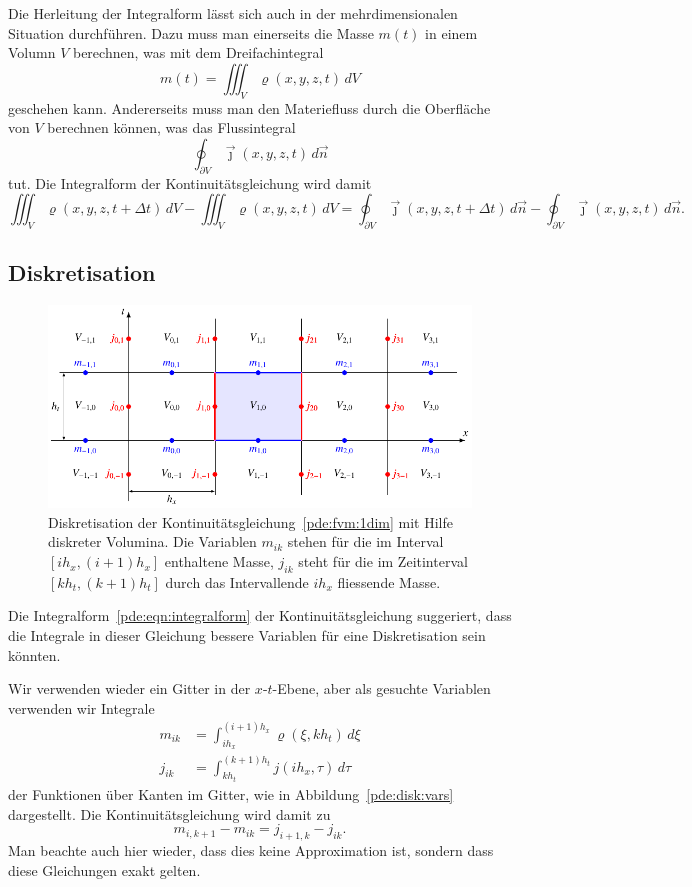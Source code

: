 Die Herleitung der Integralform lässt sich auch in der mehrdimensionalen
Situation durchführen.
Dazu muss man einerseits die Masse $m(t)$ in einem Volumn $V$ berechnen,
was mit dem Dreifachintegral
\[
m(t)
=
\iiint_V \varrho(x,y,z,t) \,dV
\]
geschehen kann.
Andererseits muss man den Materiefluss durch die Oberfläche von $V$
berechnen können, was das Flussintegral
\[
\oint_{\partial V} \vec{\jmath}(x,y,z,t) \,d\vec{n}
\]
tut.
Die Integralform der Kontinuitätsgleichung wird damit
\[
\iiint_V \varrho(x,y,z,t+\Delta t) \,dV
-
\iiint_V \varrho(x,y,z,t) \,dV
=
\oint_{\partial V} \vec{\jmath}(x,y,z,t+\Delta t)\,d\vec{n}
-
\oint_{\partial V} \vec{\jmath}(x,y,z,t)\,d\vec{n}.
\]


\subsection{Diskretisation}
\begin{figure}
\centering
\includegraphics{chapters/70-pde/images/kont.pdf}
\caption{Diskretisation der Kontinuitätsgleichung~\eqref{pde:fvm:1dim}
mit Hilfe diskreter Volumina. 
Die Variablen $m_{ik}$ stehen für die im Interval $[ih_x,(i+1)h_x]$
enthaltene Masse, $j_{ik}$ steht für die im Zeitinterval $[kh_t,(k+1)h_t]$
durch das Intervallende $ih_x$ fliessende Masse.
\label{buch:pde:fvdisk}}
\end{figure}
Die Integralform~\eqref{pde:eqn:integralform}
der Kontinuitätsgleichung suggeriert, dass die Integrale
in dieser Gleichung bessere Variablen für eine Diskretisation
sein könnten.

Wir verwenden wieder ein Gitter in der $x$-$t$-Ebene, aber 
als gesuchte Variablen verwenden wir Integrale
\begin{align*}
m_{ik}
&=
\int_{ih_x}^{(i+1)h_x} \varrho(\xi,kh_t)\,d\xi
\\
j_{ik}
&=
\int_{kh_t}^{(k+1)h_t} j(ih_x,\tau) \,d\tau
\end{align*}
der Funktionen über Kanten im Gitter, wie in Abbildung~\ref{pde:disk:vars}
dargestellt.
Die Kontinuitätsgleichung wird damit zu
\begin{equation}
m_{i,k+1}-m_{ik}
=
j_{i+1,k}-j_{ik}.
\label{pde:fvm:1dim}
\end{equation}
Man beachte auch hier wieder, dass dies keine Approximation ist, sondern
dass diese Gleichungen exakt gelten.

